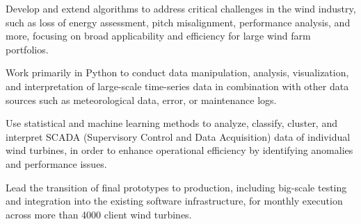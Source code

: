 \begin{tightemize}
    \item Develop and extend algorithms to address critical challenges in the wind industry, such as loss of energy assessment, pitch misalignment, performance analysis, and more, focusing on broad applicability and efficiency for large wind farm portfolios.
    \item Work primarily in Python to conduct data manipulation, analysis, visualization, and interpretation of large-scale time-series data in combination with other data sources such as meteorological data, error, or maintenance logs.
    \item Use statistical and machine learning methods to analyze, classify, cluster, and interpret SCADA (Supervisory Control and Data Acquisition) data of individual wind turbines, in order to enhance operational efficiency by identifying anomalies and performance issues.
    \item Lead the transition of final prototypes to production, including big-scale testing and integration into the existing software infrastructure, for monthly execution across more than 4000 client wind turbines.
\end{tightemize}